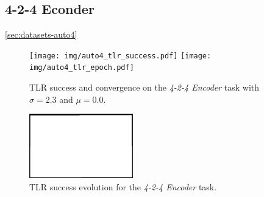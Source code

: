
\subsection{4-2-4 Econder} 
\label{sec:tlr-auto4} 

\ref{sec:datasets-auto4} 
\begin{figure}[H]
  \centering
  \texttt{[image: img/auto4\_tlr\_success.pdf]}   
  \texttt{[image: img/auto4\_tlr\_epoch.pdf]}     
  \caption{TLR success and convergence on the \emph{4-2-4 Encoder} task with $\sigma = 2.3$ and $\mu = 0.0$.}
  \label{fig:results-tlr-auto4-performance}
\end{figure}

\begin{figure}[H]
  \centering
  \includegraphics[width=0.4\textwidth]{img/placeholder.png}    
  \caption{TLR success evolution for the \emph{4-2-4 Encoder} task.}
  \label{fig:results-tlr-auto4-epoch} 
\end{figure}
